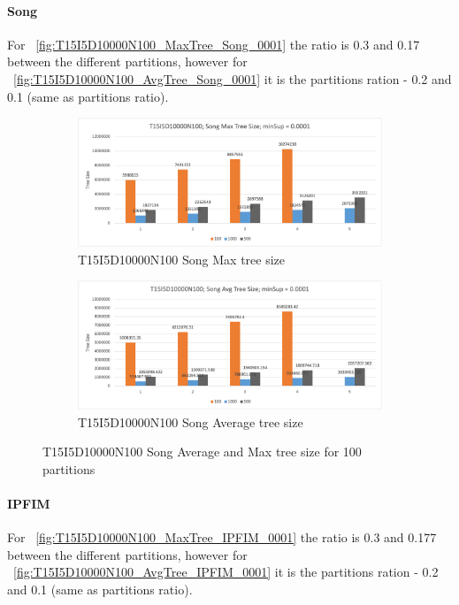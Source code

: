 \paragraph{Song}
For ~\autoref{fig:T15I5D10000N100_MaxTree_Song_0001} the ratio is 0.3 and 0.17 between the different partitions, however for ~\autoref{fig:T15I5D10000N100_AvgTree_Song_0001} it is the partitions ration - 0.2 and 0.1 (same as partitions ratio).

\begin{figure}[H]
  \centering
  \begin{subfigure}{\linewidth}
  \centering
  \includegraphics[width=\linewidth ,height=\textheight, keepaspectratio]{figures/4iterations/T15I5D10000N100_MaxTree_Song_0001}
  \caption{T15I5D10000N100 Song Max tree size}
  \label{fig:T15I5D10000N100_MaxTree_Song_0001}
\end{subfigure}
  \begin{subfigure}{\linewidth}
  \centering
  \includegraphics[width=\linewidth ,height=\textheight, keepaspectratio]{figures/4iterations/T15I5D10000N100_AvgTree_Song_0001}
  \caption{T15I5D10000N100 Song Average tree size}
  \label{fig:T15I5D10000N100_AvgTree_Song_0001}
\end{subfigure}
\caption{T15I5D10000N100 Song Average and Max tree size for 100 partitions}
\end{figure}

\paragraph{IPFIM}
For ~\autoref{fig:T15I5D10000N100_MaxTree_IPFIM_0001} the ratio is 0.3 and 0.177 between the different partitions, however for ~\autoref{fig:T15I5D10000N100_AvgTree_IPFIM_0001} it is the partitions ration - 0.2 and 0.1 (same as partitions ratio).

